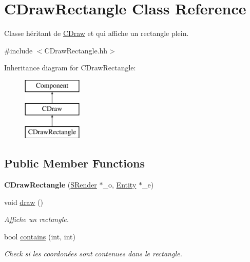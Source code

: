 \hypertarget{class_c_draw_rectangle}{}\section{C\+Draw\+Rectangle Class Reference}
\label{class_c_draw_rectangle}


Classe héritant de \hyperlink{class_c_draw}{C\+Draw} et qui affiche un rectangle plein.  




{\ttfamily \#include $<$C\+Draw\+Rectangle.\+hh$>$}

Inheritance diagram for C\+Draw\+Rectangle\+:\begin{figure}[H]
\begin{center}
\leavevmode
\includegraphics[height=3.000000cm]{class_c_draw_rectangle}
\end{center}
\end{figure}
\subsection*{Public Member Functions}
\begin{DoxyCompactItemize}
\item 
\hypertarget{class_c_draw_rectangle_a23518a125976332ae386ae131ff09308}{}{\bfseries C\+Draw\+Rectangle} (\hyperlink{class_s_render}{S\+Render} $\ast$\+\_\+o, \hyperlink{class_entity}{Entity} $\ast$\+\_\+e)\label{class_c_draw_rectangle_a23518a125976332ae386ae131ff09308}

\item 
\hypertarget{class_c_draw_rectangle_a5131f0b1d1e344e8efe51eb622b4dd3c}{}void \hyperlink{class_c_draw_rectangle_a5131f0b1d1e344e8efe51eb622b4dd3c}{draw} ()\label{class_c_draw_rectangle_a5131f0b1d1e344e8efe51eb622b4dd3c}

\begin{DoxyCompactList}\small\item\em Affiche un rectangle. \end{DoxyCompactList}\item 
bool \hyperlink{class_c_draw_rectangle_acce972838f746be315238e15ecf47cae}{contains} (int, int)
\begin{DoxyCompactList}\small\item\em Check si les coordonées sont contenues dans le rectangle. \end{DoxyCompactList}\end{DoxyCompactItemize}
